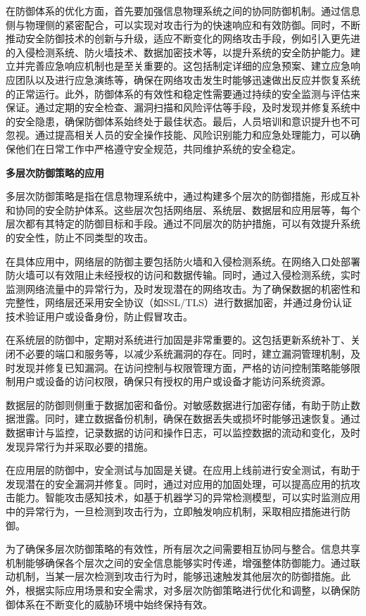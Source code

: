 在防御体系的优化方面，首先要加强信息物理系统之间的协同防御机制。通过信息侧与物理侧的紧密配合，可以实现对攻击行为的快速响应和有效防御。同时，不断推动安全防御技术的创新与升级，适应不断变化的网络攻击手段，例如引入更先进的入侵检测系统、防火墙技术、数据加密技术等，以提升系统的安全防护能力。建立并完善应急响应机制也是至关重要的。这包括制定详细的应急预案、建立应急响应团队以及进行应急演练等，确保在网络攻击发生时能够迅速做出反应并恢复系统的正常运行。此外，防御体系的有效性和稳定性需要通过持续的安全监测与评估来保证。通过定期的安全检查、漏洞扫描和风险评估等手段，及时发现并修复系统中的安全隐患，确保防御体系始终处于最佳状态。最后，人员培训和意识提升也不可忽视。通过提高相关人员的安全操作技能、风险识别能力和应急处理能力，可以确保他们在日常工作中严格遵守安全规范，共同维护系统的安全稳定。

\textbf{多层次防御策略的应用}

多层次防御策略是指在信息物理系统中，通过构建多个层次的防御措施，形成互补和协同的安全防护体系。这些层次包括网络层、系统层、数据层和应用层等，每个层次都有其特定的防御目标和手段。通过不同层次的防护措施，可以有效提升系统的安全性，防止不同类型的攻击。

在具体应用中，网络层的防御主要包括防火墙和入侵检测系统。在网络入口处部署防火墙可以有效阻止未经授权的访问和数据传输。同时，通过入侵检测系统，实时监测网络流量中的异常行为，及时发现潜在的网络攻击。为了确保数据的机密性和完整性，网络层还采用安全协议（如SSL/TLS）进行数据加密，并通过身份认证技术验证用户或设备身份，防止假冒攻击。

在系统层的防御中，定期对系统进行加固是非常重要的。这包括更新系统补丁、关闭不必要的端口和服务等，以减少系统漏洞的存在。同时，建立漏洞管理机制，及时发现并修复已知漏洞。在访问控制与权限管理方面，严格的访问控制策略能够限制用户或设备的访问权限，确保只有授权的用户或设备才能访问系统资源。

数据层的防御则侧重于数据加密和备份。对敏感数据进行加密存储，有助于防止数据泄露。同时，建立数据备份机制，确保在数据丢失或损坏时能够迅速恢复。通过数据审计与监控，记录数据的访问和操作日志，可以监控数据的流动和变化，及时发现异常行为并采取必要的措施。

在应用层的防御中，安全测试与加固是关键。在应用上线前进行安全测试，有助于发现潜在的安全漏洞并修复。同时，通过对应用的加固处理，可以提高应用的抗攻击能力。智能攻击感知技术，如基于机器学习的异常检测模型，可以实时监测应用中的异常行为，一旦检测到攻击行为，立即触发响应机制，采取相应措施进行防御。

为了确保多层次防御策略的有效性，所有层次之间需要相互协同与整合。信息共享机制能够确保各个层次之间的安全信息能够实时传递，增强整体防御能力。通过联动机制，当某一层次检测到攻击行为时，能够迅速触发其他层次的防御措施。此外，根据实际应用场景和安全需求，对多层次防御策略进行优化和调整，以确保防御体系在不断变化的威胁环境中始终保持有效。

